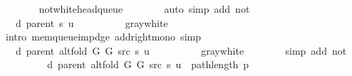 \begin{isabellebody}
\ \ \ \ \ \ \isamarkupfalse%
\ not{\isacharunderscore}{\kern0pt}white{\isacharunderscore}{\kern0pt}head{\isacharunderscore}{\kern0pt}queue\isanewline
\ \ \ \ \ \ \isamarkupfalse%
\ {\isacharparenleft}{\kern0pt}auto\ simp\ add{\isacharcolon}{\kern0pt}\ not{\isacharunderscore}{\kern0pt}{\isacharparenleft}{\kern0pt}{}{\isacharparenright}{\kern0pt}{\isacharparenright}{\kern0pt}\isanewline
\ \ \ \ \isamarkupfalse%
\ \isamarkupfalse%
\ {\isachardoublequoteopen}{\isachardot}{\kern0pt}{\isachardot}{\kern0pt}{\isachardot}{\kern0pt}\ {\isasymle}\ d\ {\isacharparenleft}{\kern0pt}parent\ s{\isacharparenright}{\kern0pt}\ u\ {\isacharplus}{\kern0pt}\ {}{\isachardoublequoteclose}\isanewline
\ \ \ \ \ \ \isamarkupfalse%
\ gray{\isacharunderscore}{\kern0pt}white\isanewline
\ \ \ \ \ \ \isamarkupfalse%
\ {\isacharparenleft}{\kern0pt}intro\ mem{\isacharunderscore}{\kern0pt}queue{\isacharunderscore}{\kern0pt}imp{\isacharunderscore}{\kern0pt}d{\isacharunderscore}{\kern0pt}ge\ add{\isacharunderscore}{\kern0pt}right{\isacharunderscore}{\kern0pt}mono{\isacharparenright}{\kern0pt}\ simp\isanewline
\ \ \ \ \isamarkupfalse%
\ \isamarkupfalse%
\ {\isachardoublequoteopen}{\isachardot}{\kern0pt}{\isachardot}{\kern0pt}{\isachardot}{\kern0pt}\ {\isacharequal}{\kern0pt}\ d\ {\isacharparenleft}{\kern0pt}parent\ {\isacharparenleft}{\kern0pt}alt{\isacharunderscore}{\kern0pt}fold\ G{}\ G{}\ src\ s{\isacharparenright}{\kern0pt}{\isacharparenright}{\kern0pt}\ u\ {\isacharplus}{\kern0pt}\ {}{\isachardoublequoteclose}\isanewline
\ \ \ \ \ \ \isamarkupfalse%
\ gray{\isacharunderscore}{\kern0pt}white\isanewline
\ \ \ \ \ \ \isamarkupfalse%
\ {\isacharparenleft}{\kern0pt}simp\ add{\isacharcolon}{\kern0pt}\ not{\isacharunderscore}{\kern0pt}{\isacharparenleft}{\kern0pt}{}{\isacharparenright}{\kern0pt}{\isacharparenright}{\kern0pt}\isanewline
\ \ \ \ \isamarkupfalse%
\ \isamarkupfalse%
\ {\isachardoublequoteopen}{\isachardot}{\kern0pt}{\isachardot}{\kern0pt}{\isachardot}{\kern0pt}\ {\isasymle}\ d\ {\isacharparenleft}{\kern0pt}parent\ {\isacharparenleft}{\kern0pt}alt{\isacharunderscore}{\kern0pt}fold\ G{}\ G{}\ src\ s{\isacharparenright}{\kern0pt}{\isacharparenright}{\kern0pt}\ u\ {\isacharplus}{\kern0pt}\ path{\isacharunderscore}{\kern0pt}length\ p{\isachardoublequoteclose}\isanewline
\ \ \ \ \ \ \isamarkupfalse%

\end{isabellebody}
